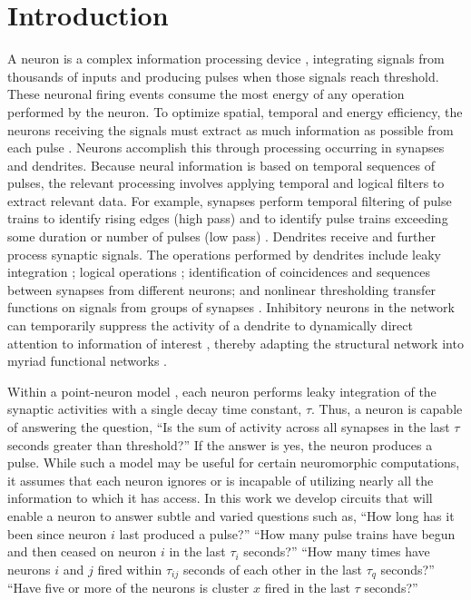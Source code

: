 \documentclass[twocolumn]{article}
\begin{document}
\section{\label{sec:introduction}Introduction}
A neuron is a complex information processing device \cite{ko1997}, integrating signals from thousands of inputs and producing pulses when those signals reach threshold. These neuronal firing events consume the most energy of any operation performed by the neuron. To optimize spatial, temporal and energy efficiency, the neurons receiving the signals must extract as much information as possible from each pulse \cite{lase2003}. Neurons accomplish this through processing occurring in synapses and dendrites. Because neural information is based on temporal sequences of pulses, the relevant processing involves applying temporal and logical filters to extract relevant data. For example, synapses perform temporal filtering of pulse trains to identify rising edges (high pass) and to identify pulse trains exceeding some duration or number of pulses (low pass) \cite{abre2004}. Dendrites receive and further process synaptic signals. The operations performed by dendrites include leaky integration \cite{geki2002}; logical operations \cite{stsp2015}; identification of coincidences \cite{stsp2015} and sequences \cite{stse2007,haah2015} between synapses from different neurons; and nonlinear thresholding transfer functions on signals from groups of synapses \cite{sava2017}. Inhibitory neurons in the network can temporarily suppress the activity of a dendrite to dynamically direct attention to information of interest \cite{enfr2001}, thereby adapting the structural network into myriad functional networks \cite{brme2010}.

Within a point-neuron model \cite{geki2002}, each neuron performs leaky integration of the synaptic activities with a single decay time constant, $\tau$. Thus, a neuron is capable of answering the question, ``Is the sum of activity across all synapses in the last $\tau$ seconds greater than threshold?'' If the answer is yes, the neuron produces a pulse. While such a model may be useful for certain neuromorphic computations, it assumes that each neuron ignores or is incapable of utilizing nearly all the information to which it has access. In this work we develop circuits that will enable a neuron to answer subtle and varied questions such as, ``How long has it been since neuron $i$ last produced a pulse?'' ``How many pulse trains have begun and then ceased on neuron $i$ in the last $\tau_i$ seconds?'' ``How many times have neurons $i$ and $j$ fired within $\tau_{ij}$ seconds of each other in the last $\tau_q$ seconds?'' ``Have five or more of the neurons is cluster $x$ fired in the last $\tau$ seconds?''
\end{document}
